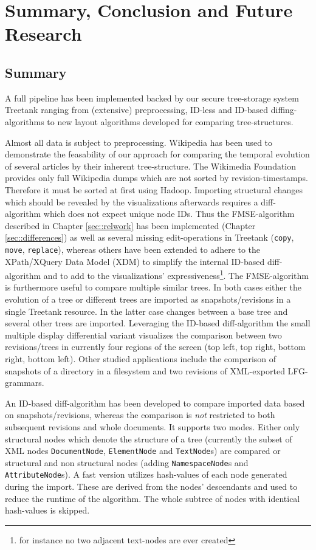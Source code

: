 \section{Summary, Conclusion and Future Research}\label{sec::conclusion}
\subsection{Summary}
A full pipeline has been implemented backed by our secure tree-storage system Treetank ranging from (extensive) preprocessing, ID-less and ID-based diffing-algorithms to new layout algorithms developed for comparing tree-structures.

Almost all data is subject to preprocessing. Wikipedia has been used to demonstrate the feasability of our approach for comparing the temporal evolution of several articles by their inherent tree-structure. The Wikimedia Foundation provides only full Wikipedia dumps which are not sorted by revision-timestamps. Therefore it must be sorted at first using Hadoop. Importing structural changes which should be revealed by the visualizations afterwards requires a diff-algorithm which does not expect unique node IDs. Thus the FMSE-algorithm described in Chapter \ref{sec::relwork} has been implemented (Chapter \ref{sec::differences}) as well as several missing edit-operations in Treetank (\texttt{copy}, \texttt{move}, \texttt{replace}), whereas others have been extended to adhere to the XPath/XQuery Data Model (XDM) to simplify the internal ID-based diff-algorithm and to add to the visualizations' expressiveness\footnote{for instance no two adjacent text-nodes are ever created}. The FMSE-algorithm is furthermore useful to compare multiple similar trees. In both cases either the evolution of a tree or different trees are imported as snapshots/revisions in a single Treetank resource. In the latter case changes between a base tree and several other trees are imported. Leveraging the ID-based diff-algorithm the small multiple display differential variant visualizes the comparison between two revisions/trees in currently four regions of the screen (top left, top right, bottom right, bottom left). Other studied applications include the comparison of snapshots of a directory in a filesystem and two revisions of XML-exported LFG-grammars.

An ID-based diff-algorithm has been developed to compare imported data based on snapshots/revisions, whereas the comparison is \emph{not} restricted to both subsequent revisions and whole documents. It supports two modes. Either only structural nodes which denote the structure of a tree (currently the subset of XML nodes \texttt{DocumentNode}, \texttt{ElementNode} and \texttt{TextNode}s) are compared or structural and non structural nodes (adding \texttt{NamespaceNode}s and \texttt{AttributeNode}s). A fast version utilizes hash-values of each node generated during the import. These are derived from the nodes' descendants and used to reduce the runtime of the algorithm. The whole subtree of nodes with identical hash-values is skipped.

